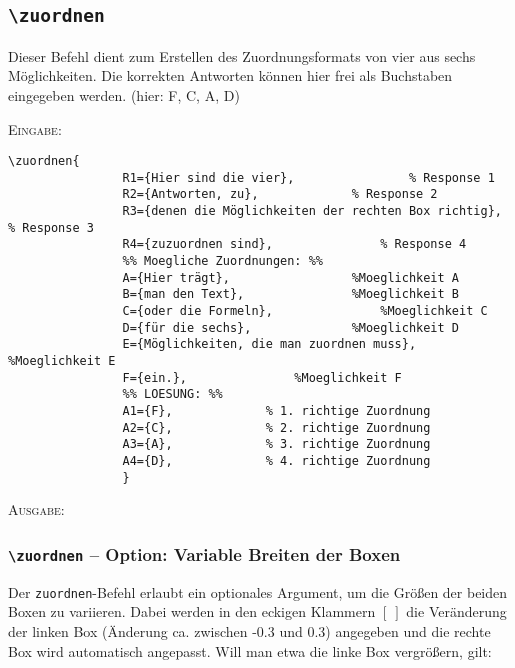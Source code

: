 \documentclass[a4paper,12pt]{article}
\begin{document}
\subsection{\texttt{\textbackslash zuordnen}}
Dieser Befehl dient zum Erstellen des Zuordnungsformats von vier aus sechs Möglichkeiten.
Die korrekten Antworten können hier frei als Buchstaben eingegeben werden. (hier: F, C, A, D)

\leer

\textsc{Eingabe:}
\begin{verbatim}
\zuordnen{
				R1={Hier sind die vier},				% Response 1
				R2={Antworten, zu},				% Response 2
				R3={denen die Möglichkeiten der rechten Box richtig},				% Response 3
				R4={zuzuordnen sind},				% Response 4
				%% Moegliche Zuordnungen: %%
				A={Hier trägt}, 				%Moeglichkeit A  
				B={man den Text}, 				%Moeglichkeit B  
				C={oder die Formeln}, 				%Moeglichkeit C  
				D={für die sechs}, 				%Moeglichkeit D  
				E={Möglichkeiten, die man zuordnen muss}, 				%Moeglichkeit E  
				F={ein.}, 				%Moeglichkeit F  
				%% LOESUNG: %%
				A1={F},				% 1. richtige Zuordnung
				A2={C},				% 2. richtige Zuordnung
				A3={A},				% 3. richtige Zuordnung
				A4={D},				% 4. richtige Zuordnung
				}
\end{verbatim}
\leer

\textsc{Ausgabe:}


\subsubsection{\texttt{\textbackslash zuordnen} -- Option: Variable Breiten der Boxen}

Der \texttt{zuordnen}-Befehl erlaubt ein optionales Argument, um die Größen der beiden Boxen zu variieren. Dabei werden in den eckigen Klammern $[~]$ die Veränderung der linken Box (Änderung ca. zwischen -0.3 und 0.3) angegeben und die rechte Box wird automatisch angepasst. Will man etwa die linke Box vergrößern, gilt:  
 
\end{document}
